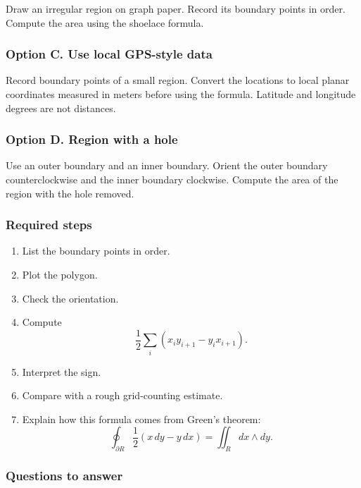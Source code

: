 Draw an irregular region on graph paper.  Record its boundary points in order.  Compute
the area using the shoelace formula.

\subsubsection*{Option C. Use local GPS-style data}

Record boundary points of a small region.  Convert the locations to local planar
coordinates measured in meters before using the formula.  Latitude and longitude
degrees are not distances.

\subsubsection*{Option D. Region with a hole}

Use an outer boundary and an inner boundary.  Orient the outer boundary
counterclockwise and the inner boundary clockwise.  Compute the area of the region
with the hole removed.

\subsubsection*{Required steps}

\begin{enumerate}
\item List the boundary points in order.

\item Plot the polygon.

\item Check the orientation.

\item Compute
\[
    \frac12\sum_i (x_i y_{i+1}-y_i x_{i+1}).
\]

\item Interpret the sign.

\item Compare with a rough grid-counting estimate.

\item Explain how this formula comes from Green's theorem:
\[
    \oint_{\partial R}\frac12(x\,dy-y\,dx)
    =
    \iint_R dx\wedge dy.
\]
\end{enumerate}

\subsubsection*{Questions to answer}

